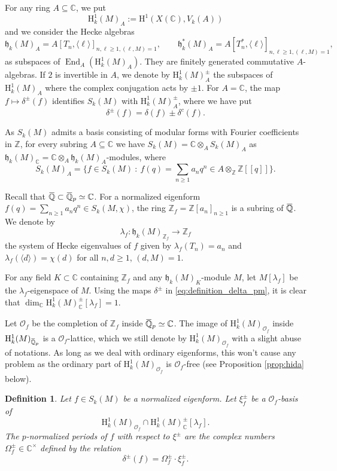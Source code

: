 \documentclass[12pt]{amsart}
\newcommand\bC{\mathbb{C}}
\newcommand\bZ{\mathbb{Z}}
\newcommand\bQ{\mathbb{Q}}
\newcommand\cO{\mathcal{O}}
\newcommand\gh{\mathfrak{h}}
\newcommand{\ob}[1]{\mkern 1.5mu\overline{\mkern-1.5mu#1\mkern-1.5mu}\mkern 1.5mu}
\DeclareMathOperator{\End}{End}
\newcommand{\HH}{\mathrm{H}}
\theoremstyle{defstyle}
\newtheorem{definition}[subsubsection]{Definition}
\theoremstyle{thmstyle}
\begin{document}
For any ring $A\subseteq \bC$, we put 
\[\HH^1_k(M)_A:= \HH^1(X(\bC),V_k(A))\]
and we consider the Hecke algebras 
\[\gh_k(M)_A=A[T_n,\langle \ell \rangle]_{n,\ell\geq 1, (\ell,M)=1}, \qquad \gh^*_k(M)_A=A[T^*_n,\langle \ell \rangle]_{n,\ell\geq 1, (\ell,M)=1},\]
as subspaces of $\End_A(\HH^1_k(M)_A)$.
They are finitely generated commutative $A$-algebras. If $2$ is invertible in $A$, we denote by $\HH^1_k(M)_A^\pm$ the subspaces of $\HH^1_k(M)_A$ where the complex conjugation acts by $\pm1$. For $A=\bC$, the map $f \mapsto \delta^\pm(f)$ identifies $S_k(M)$ with $\HH^1_k(M)_A^\pm$, where we have put 
\begin{equation}\label{eq:definition_delta_pm}
	\delta^\pm(f)=\delta(f)\pm\delta^c(f).
\end{equation}

As $S_k(M)$ admits a basis consisting of modular forms with Fourier coefficients in $\bZ$, for every subring $A\subseteq \bC$ we have $S_k(M)=\bC \otimes_{A} S_k(M)_A$ as $\gh_k(M)_\bC=\bC\otimes_A \gh_k(M)_A$-modules, where 
\[S_k(M)_A=\{f\in S_k(M) \ \colon\ f(q)=\sum_{n\geq 1}a_nq^n\in A\otimes_{\bZ}\bZ[[q]] \}.\] 

Recall that $\ob{\bQ}\subset \ob{\bQ}_p\simeq \bC$.  For a normalized eigenform $f(q)=\sum_{n\geq 1}a_nq^n\in S_k(M,\chi)$, the ring $\bZ_f=\bZ[a_n]_{n\geq 1}$ is a subring of $\ob{\bQ}$. We denote by \[\lambda_f \colon \gh_k(M)_{\bZ_f} \to \bZ_f\]
the system of Hecke eigenvalues of $f$ given by $\lambda_f(T_n)=a_n$ and $\lambda_f(\langle d\rangle)=\chi(d)$ for all $n,d\geq 1$, $(d,M)=1$.

For any field $K\subset \bC$ containing $\bZ_f$ and any $\gh_k(M)_K$-module $M$, let $M[\lambda_f]$ be the $\lambda_f$-eigenspace of $M$. 
Using the maps $\delta^\pm$ in \eqref{eq:definition_delta_pm}, it is clear that $\dim_\bC\HH^1_k(M)^\pm_\bC[\lambda_f]=1$. 

Let $\cO_f$ be the completion of $\bZ_f$ inside $\ob{\bQ}_p\simeq\bC$. The image of $\HH^1_k(M)_{\cO_f}$ inside $\HH^1_k(M)_{\ob{\bQ}_p}$ is a $\cO_f$-lattice, which  we still denote by $\HH^1_k(M)_{\cO_f}$ with a slight abuse of notations. As long as we deal with ordinary eigenforms, this won't cause any problem as the ordinary part of $\HH^1_k(M)_{\cO_f}$ is $\cO_f$-free (see Proposition \ref{prop:hida} below).

\begin{definition}\label{def:canonical_periods}
 Let $f\in S_k(M)$ be a normalized eigenform. Let $\xi_f^\pm$ be a $\cO_f$-basis of 
 \begin{equation}\label{eq:eigenspace_definition_xi_f}
 	\HH^1_k(M)_{\cO_f} \cap \HH^1_k(M)^\pm_{\bC}[\lambda_f].
 \end{equation}
 The $p$-normalized periods of $f$ with respect to $\xi^\pm$ are the complex numbers $\Omega_f^\pm\in\bC^\times$ defined by the relation 
 \[\delta^\pm(f)=\Omega^\pm_f\cdot \xi_f^\pm.\]
\end{definition}
\end{document}
